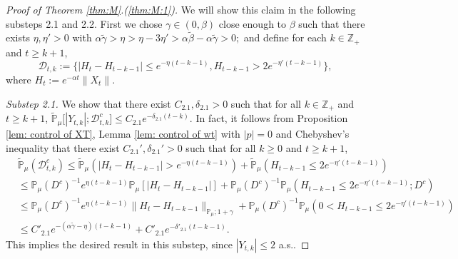 \documentclass[12pt,a4paper]{amsart}
\theoremstyle{plain}
\theoremstyle{definition}
\numberwithin{equation}{section}
\begin{document}
\begin{proof}[Proof of Theorem \ref{thm:M}.(\ref{thm:M:1})]
We will show this claim in the following substeps 2.1 and 2.2.
First we chose $\gamma \in (0,\beta)$ close enough to $\beta$ such that there exists $\eta,\eta'>0$ with
\(
\alpha \tilde \gamma
>\eta
> \eta - 3\eta'
> \alpha \tilde \beta - \alpha \tilde \gamma
> 0;
\)
and define for each $k \in \mathbb Z_+$ and $t\geq k+1$,
\[
\mathcal{D}_{t,k}
  :=\{|H_t-H_{t-k-1}|\leq  e^{-\eta (t-k-1)}, H_{t-k-1}> 2e^{-\eta' (t-k-1)}\},
\]
where $H_t := e^{-\alpha t}\|X_t\|$.

  \emph{Substep 2.1.} We show that there exist $C_{2.1},\delta_{2.1} >0$ such that for all $k \in \mathbb Z_+$ and $t\geq k+1$, $ \mathbb{\widetilde{P}}_{\mu} \big[ |Y_{t,k}| ;\mathcal{D}^c_{t,k} \big] \leq C_{2.1} e^{-\delta_{2.1} (t-k)}.$
  In fact, it follows from Proposition \ref{lem: control of XT}, Lemma \ref{lem: control of wt} with $|p|=0$ and Chebyshev's inequality that there exist $C_{2.1}', \delta_{2.1}'>0$ such that for all $k \geq 0$ and $t\geq k+1$,
  \begin{align}
    \label{eq: prob of Dtkc}
    & \mathbb{\widetilde{P}}_{\mu}(\mathcal{D}_{t,k}^c)
    \leq \mathbb{\widetilde{P}}_{\mu}(|H_t-H_{t-k-1}| > e^{-\eta (t-k-1)})+\mathbb{\widetilde{P}}_{\mu}(H_{t-k-1}\leq 2e^{-\eta'(t-k-1)}) \\
    & \leq \mathbb{P}_{\mu}(D^c)^{-1}e^{\eta(t-k-1)}\mathbb{P}_{\mu}[|H_t-H_{t-k-1}|] +  \mathbb{P}_{\mu}(D^c)^{-1} \mathbb P_\mu(H_{t-k-1}\leq 2e^{-\eta'(t-k-1)}; D^c) \\
    & \leq \mathbb{P}_{\mu}(D^c)^{-1}  e^{\eta(t-k-1)}\|H_t - H_{t-k-1}\|_{\mathbb P_\mu; 1+\gamma} + \mathbb{P}_{\mu}(D^c)^{-1} \mathbb P_\mu(0<H_{t-k-1}\leq 2e^{-\eta'(t-k-1)}) \\
    & \leq C'_{2.1} e^{-(\alpha \tilde \gamma - \eta)(t-k-1)}+C'_{2.1} e^{-\delta'_{2.1}(t-k-1)}.
  \end{align}
  This implies the desired result in this substep, since $|Y_{t,k}| \leq 2$ a.s..



\end{proof}
\end{document}
